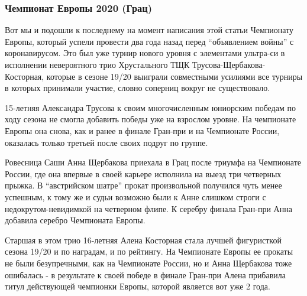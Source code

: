  
 
 
 
 
\subsubsection{Чемпионат Европы 2020 (Грац)}
\label{sec:04_01_2022.yz.figurka_ot_maksima_jagudina.1.chempionaty_evropy.10.grac_2020}

Вот мы и подошли к последнему на момент написания этой статьи Чемпионату
Европы, который успели провести два года назад перед \enquote{объявлением войны} с
коронавирусом. Это был уже турнир нового уровня с элементами ультра-си в
исполнении невероятного трио Хрустального ТЩК Трусова-Щербакова-Косторная,
которые в сезоне 19/20 выиграли совместными усилиями все турниры в которых
принимали участие, словно соперниц вокруг не существовало. 


15-летняя Александра Трусова к своим многочисленным юниорским победам по ходу
сезона не смогла добавить победы уже на взрослом уровне. На чемпионате Европы
она снова, как и ранее в финале Гран-при и на Чемпионате России, оказалась
только третьей после своих подруг по группе.


Ровесница Саши Анна Щербакова приехала в Грац после триумфа на Чемпионате
России, где она впервые в своей карьере исполнила на выезд три четверных
прыжка. В \enquote{австрийском шатре} прокат произвольной получился чуть менее
успешным, к тому же и судьи возможно были к Анне слишком строги с
недокрутом-невидимкой на четверном флипе. К серебру финала Гран-при Анна
добавила серебро Чемпионата Европы.

Старшая в этом трио 16-летняя Алена Косторная стала лучшей фигуристкой сезона
19/20 и по наградам, и по рейтингу. На Чемпионате Европы ее прокаты не были
безупречными, как на Чемпионате России, но и Анна Щербакова тоже ошибалась - в
результате к своей победе в финале Гран-при Алена прибавила титул действующей
чемпионки Европы, которой является вот уже 2 года.

